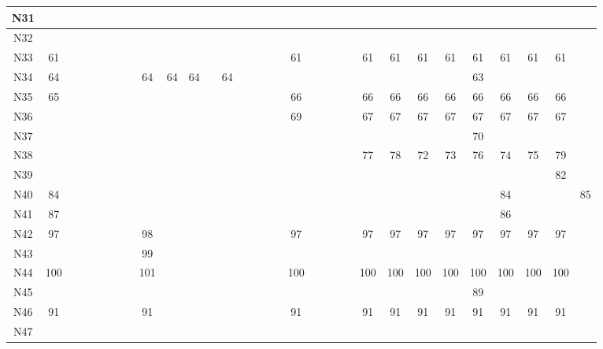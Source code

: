 \documentclass[11pt,a4paper]{article}
\begin{document}
\begin{lrbox}{\lltablebox}
\begin{tabular}{|*{31}{c|}}
N31 &  &  &  &  &  &  &  &  &  &  &  &  &  &  &  &  &  &  &  &  &  &  &  &  &  &  &  &  &  &  \\ \hline
N32 &  &  &  &  &  &  &  &  &  &  &  &  &  &  &  &  &  &  &  &  &  &  &  &  &  &  &  &  &  &  \\ \hline
N33 & 61 &  &  &  &  &  &  &  &  &  &  &  &  &  &  &  & 61 &  &  &  &  & 61 & 61 & 61 & 61 & 61 & 61 & 61 & 61 &  \\ \hline
N34 & 64 &  &  &  &  &  &  & 64 & 64 & 64 &  & 64 &  &  &  &  &  &  &  &  &  &  &  &  &  & 63 &  &  &  &  \\ \hline
N35 & 65 &  &  &  &  &  &  &  &  &  &  &  &  &  &  &  & 66 &  &  &  &  & 66 & 66 & 66 & 66 & 66 & 66 & 66 & 66 &  \\ \hline
N36 &  &  &  &  &  &  &  &  &  &  &  &  &  &  &  &  & 69 &  &  &  &  & 67 & 67 & 67 & 67 & 67 & 67 & 67 & 67 &  \\ \hline
N37 &  &  &  &  &  &  &  &  &  &  &  &  &  &  &  &  &  &  &  &  &  &  &  &  &  & 70 &  &  &  &  \\ \hline
N38 &  &  &  &  &  &  &  &  &  &  &  &  &  &  &  &  &  &  &  &  &  & 77 & 78 & 72 & 73 & 76 & 74 & 75 & 79 &  \\ \hline
N39 &  &  &  &  &  &  &  &  &  &  &  &  &  &  &  &  &  &  &  &  &  &  &  &  &  &  &  &  & 82 &  \\ \hline
N40 & 84 &  &  &  &  &  &  &  &  &  &  &  &  &  &  &  &  &  &  &  &  &  &  &  &  &  & 84 &  &  & 85 \\ \hline
N41 & 87 &  &  &  &  &  &  &  &  &  &  &  &  &  &  &  &  &  &  &  &  &  &  &  &  &  & 86 &  &  &  \\ \hline
N42 & 97 &  &  &  &  &  &  & 98 &  &  &  &  &  &  &  &  & 97 &  &  &  &  & 97 & 97 & 97 & 97 & 97 & 97 & 97 & 97 &  \\ \hline
N43 &  &  &  &  &  &  &  & 99 &  &  &  &  &  &  &  &  &  &  &  &  &  &  &  &  &  &  &  &  &  &  \\ \hline
N44 & 100 &  &  &  &  &  &  & 101 &  &  &  &  &  &  &  &  & 100 &  &  &  &  & 100 & 100 & 100 & 100 & 100 & 100 & 100 & 100 &  \\ \hline
N45 &  &  &  &  &  &  &  &  &  &  &  &  &  &  &  &  &  &  &  &  &  &  &  &  &  & 89 &  &  &  &  \\ \hline
N46 & 91 &  &  &  &  &  &  & 91 &  &  &  &  &  &  &  &  & 91 &  &  &  &  & 91 & 91 & 91 & 91 & 91 & 91 & 91 & 91 &  \\ \hline
N47 &  &  &  &  &  &  &  &  &  &  &  &  &  &  &  &  &  &  &  &  &  &  &  &  &  &  &  &  &  &  \\ \hline

\end{tabular}
\end{lrbox}
\end{document}
